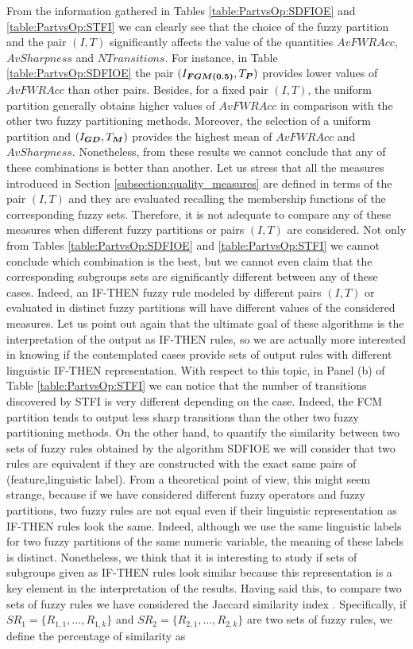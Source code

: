 From the information gathered in Tables \ref{table:PartvsOp:SDFIOE} and \ref{table:PartvsOp:STFI} we can clearly see that the choice of the fuzzy partition and the pair $(I,T)$ significantly affects the value of the quantities $AvFWRAcc$, $AvSharpness$ and $NTransitions$. For instance, in Table \ref{table:PartvsOp:SDFIOE} the pair  $(I_{\bm{ FGM(0.5)}},T_{\bm{P}})$ provides lower values of $AvFWRAcc$ than other pairs. Besides, for a fixed pair $(I,T)$, the uniform partition generally obtains higher values of $AvFWRAcc$ in comparison with the other two fuzzy partitioning methods. Moreover, the selection of  a uniform partition and $(I_{\bm{GD}},T_{\bm{M}})$ provides the highest mean of $AvFWRAcc$ and $AvSharpness$. Nonetheless, from these results we cannot conclude that any of these combinations is better than another. Let us stress that all the measures introduced in Section \ref{subsection:quality_measures} are defined in terms of the pair $(I,T)$ and they are evaluated recalling the membership functions of the corresponding fuzzy sets. Therefore, it is not adequate to compare any of these measures when different fuzzy partitions or pairs $(I,T)$ are considered. Not only from Tables \ref{table:PartvsOp:SDFIOE} and \ref{table:PartvsOp:STFI} we cannot conclude which combination is the best, but we cannot even claim that the corresponding subgroups sets are significantly different between any of these cases. Indeed, an IF-THEN fuzzy rule modeled by different pairs $(I,T)$ or evaluated in distinct fuzzy partitions will have different values of the considered measures. Let us point out again that the ultimate goal of these algorithms is the interpretation of the output as IF-THEN rules, so we are actually more interested in knowing if the contemplated cases provide sets of output rules with different linguistic IF-THEN representation. With respect to this topic, in Panel (b) of Table \ref{table:PartvsOp:STFI} we can notice that the number of transitions discovered by STFI is very different depending on the case. Indeed, the FCM partition tends to output less sharp transitions than the other two fuzzy partitioning methods. On the other hand, to quantify the similarity between two sets of fuzzy rules obtained by the algorithm SDFIOE we will consider that two rules are equivalent if they are constructed with the exact same pairs of (feature,linguistic label). From a theoretical point of view, this might seem strange, because if we have considered different fuzzy operators and fuzzy partitions, two fuzzy rules are not equal even if their linguistic representation as IF-THEN rules look the same. Indeed, although we use the same linguistic labels for two fuzzy partitions of the same numeric variable, the meaning of these labels is distinct. Nonetheless, we think that it is interesting to study if sets of subgroups given as IF-THEN rules look similar because this representation is a key element in the interpretation of the results. Having said this, to compare two sets of fuzzy rules we have considered the Jaccard similarity index \cite{Tan2018}. Specifically, if $SR_1 = \{R_{1,1},\dots,R_{1,k}\}$ and $SR_2=\{R_{2,1},\dots,R_{2,k}\}$ are two sets of fuzzy rules, we define the percentage of similarity as
